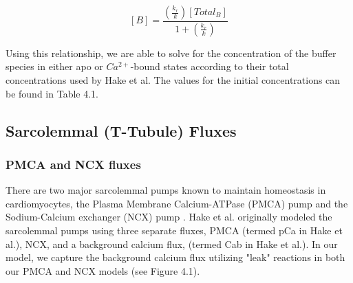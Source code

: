 \documentclass[12pt]{ucsddissertation}
\begin{document}
\begin{equation}
\left[ B\right] = \frac {\left( \frac {k_{r}}{k}\right) \left [Total_{B}\right] }{ 1+\left( \frac {k_{r}}{k}\right) }
\end{equation}

Using this relationship, we are able to solve for the concentration of the buffer species in either apo or $Ca^{2+}$-bound states according to their total concentrations used by Hake et al. The values for the initial concentrations can be found in Table 4.1.
\subsection{Sarcolemmal (T-Tubule) Fluxes}

\subsubsection{PMCA and NCX fluxes}

There are two major sarcolemmal pumps known to maintain homeostasis in cardiomyocytes, the Plasma Membrane Calcium-ATPase (PMCA) pump and the Sodium-Calcium exchanger (NCX) pump \cite{Bers2002}. Hake et al. originally modeled the sarcolemmal pumps using three separate fluxes, PMCA (termed pCa in Hake et al.), NCX, and a background calcium flux, (termed Cab in Hake et al.). In our model, we capture the background calcium flux utilizing "leak" reactions in both our PMCA and NCX models (see Figure 4.1). 
\end{document}
